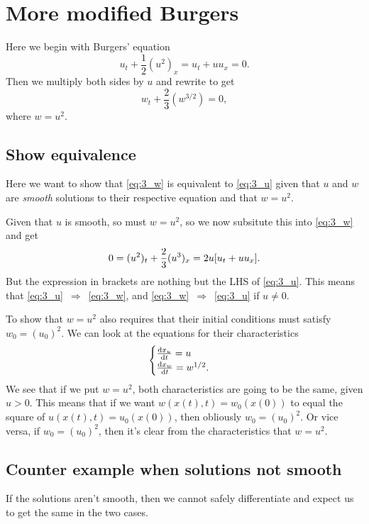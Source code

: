 \documentclass[11pt,letter, swedish, english
]{article}
\renewcommand{\thesubsection}{\arabic{section} (\alph{subsection})}
\begin{document}
\section{More modified Burgers}
\renewcommand{\thesubsection}{\arabic{section} (\alph{subsection})}
Here we begin with Burgers' equation
\begin{equation}\label{eq:3_u}
u_t + \frac{1}{2}(u^2)_x = u_t + uu_x = 0.
\end{equation}
Then we multiply both sides by $u$ and rewrite to get
\begin{equation}\label{eq:3_w}
w_t + \frac{2}{3} (w^{3/2}) = 0,
\end{equation}
where $w=u^2$.

\subsection{Show equivalence}
Here we want to show that \eqref{eq:3_w} is equivalent to
\eqref{eq:3_u} given that $u$ and $w$ are \emph{smooth} solutions to
their respective equation and that $w=u^2$.

Given that $u$ is smooth, so must $w=u^2$, so we now subsitute this
into \eqref{eq:3_w} and get
\begin{equation}
0 = (u^2)_t + \frac{2}{3} (u^{3})_x = 2u \qty[u_t+uu_x].
\end{equation}
But the expression in brackets are nothing but the LHS of
\eqref{eq:3_u}. This means that
\eqref{eq:3_u}~$\Rightarrow$~\eqref{eq:3_w}, and
\eqref{eq:3_w}~$\Rightarrow$~\eqref{eq:3_u} if $u\neq0$.

To show that $w=u^2$ also requires that their initial conditions must
satisfy $w_0=(u_0)^2$. We can look at the equations for their
characteristics
\begin{equation}
\begin{cases}
\dv{x_u}{t} = u \\
\dv{x_w}{t} = w^{1/2}.
\end{cases}
\end{equation}
We see that if we put $w=u^2$, both characteristics are going to be
the same, given $u>0$. This means that if we want $w(x(t),t) =
w_0(x(0))$ to equal the square of $u(x(t),t) = u_0(x(0))$, then
obliously $w_0 = (u_0)^2$. Or vice versa, if $w_0 = (u_0)^2$, then
it's clear from the characteristics that $w=u^2$.

\subsection{Counter example when solutions not smooth}
If the solutions aren't smooth, then we cannot safely differentiate
and expect us to get the same in the two cases. 
\end{document}
